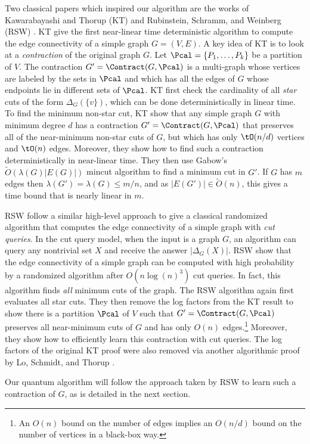 Two classical papers which inspired our algorithm are the works of Kawarabayashi and Thorup (KT) \cite{KT19} and Rubinstein, Schramm, and Weinberg (RSW) \cite{RSW18}.  
KT give the first near-linear time deterministic algorithm to compute the edge connectivity of a simple graph $G = (V,E)$.  A key idea of KT is to look at a \emph{contraction} of the original graph $G$.  Let 
$\Pcal = \{P_1, \ldots, P_k\}$ be a partition of $V$.  The contraction $G' = \Contract(G,\Pcal)$ is a multi-graph whose vertices are labeled by the sets in $\Pcal$ 
and which has all the edges of $G$ whose endpoints lie in different sets of $\Pcal$.  KT first check the cardinality of all \emph{star} cuts of the form $\Delta_G(\{v\})$, which can be 
done deterministically in linear time.  
To find the minimum non-star cut, KT show that any simple graph $G$ with minimum degree $d$ has a contraction $G'= \Contract(G,\Pcal)$ that 
preserves all of the near-minimum non-star cuts of $G$, but which has only $\tO(n/d)$ vertices and $\tO(n)$ edges.  Moreover, they 
show how to find such a contraction deterministically in near-linear time.  They then use Gabow's $\tilde O(\lambda(G)|E(G)|)$ mincut algorithm \cite{Gabow95} to find a minimum cut in $G'$.
If $G$ has $m$ edges then $\lambda(G') =\lambda(G) \leq m/n$, and as $|E(G')| \in \tilde O(n)$, this gives a time bound that is nearly linear in $m$.

RSW follow a similar high-level approach to give a classical randomized algorithm that computes the edge connectivity of a simple graph with
\emph{cut queries}.  In the cut query model, when the input is a graph $G$, an algorithm can query any nontrivial set $X$ and receive the answer $|\Delta_G(X)|$.  
RSW show that the edge connectivity of a simple graph can be computed with high probability by a randomized algorithm after $O(n \log(n)^3)$ cut queries.  
In fact, this algorithm finds \emph{all} minimum cuts of the graph.  The RSW algorithm again first evaluates all star cuts.
They then
remove the log factors from the KT result to show there is a partition $\Pcal$ of $V$ such that $G' = \Contract(G,\Pcal)$ preserves all 
near-minimum cuts of $G$ and has only $O(n)$ edges.\footnote{An $O(n)$ bound on the number of edges implies an $O(n/d)$ bound on the number of vertices in a black-box way.} 
Moreover, they show how to efficiently learn this contraction with cut queries.  
The log factors of the original KT proof were also removed via another algorithmic proof by Lo, Schmidt, and Thorup \cite{LST20}.  

Our quantum algorithm will follow the approach taken by RSW to learn such a contraction of $G$, as is detailed in the next section.

